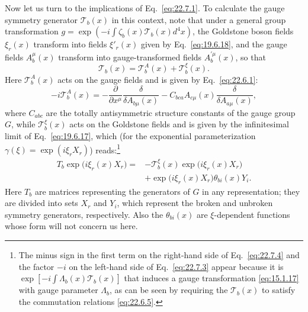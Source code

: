 Now let us turn to the implications of Eq.~\eqref{eq:22.7.1}. To
calculate the gauge symmetry generator $\mathcal T_b(x)$ in this
context, note that under a general group transformation
$g=\exp(-i\int\zeta_b(x)\mathcal T_b(x)d^4x)$, the Goldstone
boson fields $\xi_r(x)$ transform into fields $\xi'_r(x)$ given by
Eq.~\eqref{eq:19.6.18}, and the gauge fields $A^\mu_b(x)$ transform
into gauge-transformed fields $A^{\prime\mu}_b(x)$, so that
\begin{equation}
 \mathcal T_b(x)=\mathcal T_b^A(x)+\mathcal T_b^\xi(x).
 \tag{22.7.2}\label{eq:22.7.2}
\end{equation}
Here $\mathcal T_b^A(x)$ acts on the gauge fields and is given by
Eq.~\eqref{eq:22.6.1}:
\begin{equation}
 -i\mathcal T_b^A(x)
 =-\frac{\partial}{\partial x^\mu}
 \frac{\delta}{\delta A_{b\mu}(x)}
 -C_{bca}A_{c\mu}(x)
 \frac{\delta}{\delta A_{a\mu}(x)},
 \tag{22.7.3}\label{eq:22.7.3}
\end{equation}
where $C_{abc}$ are the totally antisymmetric structure
constants of the gauge group $G$, while $\mathcal T_b^\xi(x)$ acts
on the Goldstone fields and is given by the infinitesimal limit of
Eq.~\eqref{eq:19.6.17}, which (for the exponential parameterization
$\gamma(\xi)=\exp(i\xi_rX_r)$) reads:\footnote{The minus sign in the
first term on the right-hand side of Eq.~\eqref{eq:22.7.4} and the
factor $-i$ on the left-hand side of Eq.~\eqref{eq:22.7.3} appear
because it is
$\exp[-i\int\Lambda_b(x)\mathcal T_b(x)]$ that induces a gauge
transformation \eqref{eq:15.1.17} with gauge parameter $\Lambda_b$,
as can be seen by requiring the $\mathcal T_b(x)$ to satisfy the
commutation relations \eqref{eq:22.6.5}.}
\begin{equation}
 \begin{aligned}
 T_b\exp\bigl(i\xi_r(x)X_r\bigr)
 ={}&-\mathcal T_b^\xi(x)\exp\bigl(i\xi_r(x)X_r\bigr)
 \\
 &+\exp\bigl(i\xi_r(x)X_r\bigr)\theta_{b i}(x)Y_i.
 \end{aligned}
 \tag{22.7.4}\label{eq:22.7.4}
\end{equation}
Here $T_b$ are matrices representing the generators of $G$ in any
representation; they are divided into sets $X_r$ and $Y_i$, which
represent the broken and unbroken symmetry generators, respectively.
Also the $\theta_{b i}(x)$ are $\xi$-dependent functions whose form
will not concern us here.

